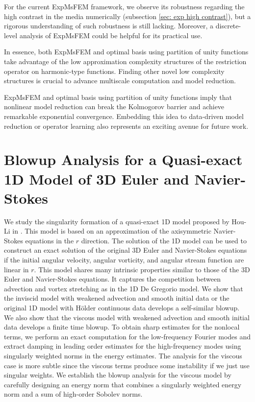 \documentclass[12pt]{caltech_thesis}
\numberwithin{equation}{section}
\begin{document}
For the current ExpMsFEM framework, we observe its robustness regarding the high contrast in the media numerically (subsection \ref{sec: exp high contrast}), but a rigorous understanding of such robustness is still lacking. Moreover, a discrete-level analysis of ExpMsFEM could be helpful for its practical use.

In essence, both ExpMsFEM and optimal basis using partition of unity functions take advantage of the low approximation complexity structures of the restriction operator on harmonic-type functions. Finding other novel low complexity structures is crucial to advance multiscale computation and model reduction. 

ExpMsFEM and optimal basis using partition of unity functions imply that nonlinear model reduction can break the Kolmogorov barrier and achieve remarkable exponential convergence. Embedding this idea to data-driven model reduction or operator learning also represents an exciting avenue for future work.


\printbibliography[heading=bibintoc]

\appendix







\appendix
\chapter{Blowup Analysis for a Quasi-exact 1D Model of 3D Euler and Navier-Stokes}
\label{append:hou-li}
We study the singularity formation of a quasi-exact 1D model proposed by Hou-Li in \cite{hou2008dynamic}. This model is based on an approximation of the axisymmetric Navier-Stokes equations in the $r$ direction. The solution of the 1D model can be used to construct an exact solution of the original 3D Euler and Navier-Stokes equations if the initial angular velocity, angular vorticity, and angular stream function are linear in $r$. This model shares many intrinsic properties similar to those of the 3D Euler and Navier-Stokes equations. It captures the competition between advection and vortex stretching as in the 1D De Gregorio \cite{de1990one, de1996partial} model. We show that the inviscid model with weakened advection and smooth initial data or the original 1D model with H\"older continuous data develops a self-similar blowup. We also show that the viscous model with weakened advection and smooth initial data develops a finite time blowup. %
To obtain sharp estimates for the nonlocal terms, we perform an exact computation  for the low-frequency Fourier modes and  {extract damping in leading order estimates}  for the high-frequency modes using singularly weighted norms {in the energy estimates}. The analysis for the viscous case is more subtle since the viscous terms produce some instability if we just use singular weights. We establish the blowup analysis for the viscous model by carefully designing an energy norm that combines a singularly weighted energy norm and a {sum of} high-order Sobolev norms.
\end{document}
